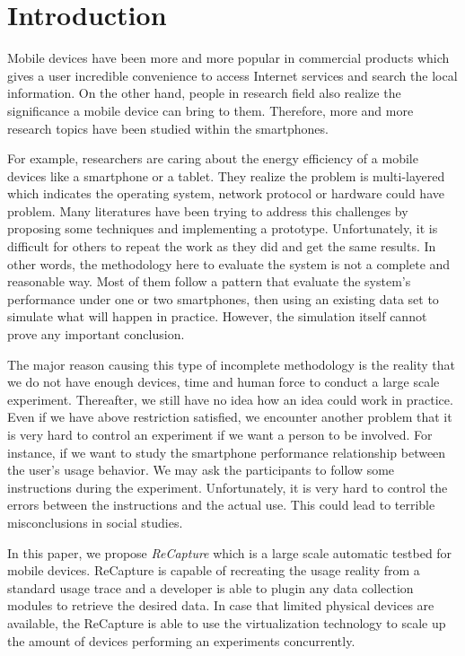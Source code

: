 \section{Introduction}\label{sec:introduction}
Mobile devices have been more and more popular in commercial products which gives a user incredible convenience to access Internet services and search the local information. On the other hand, people in research field also realize the significance a mobile device can bring to them. Therefore, more and more research topics have been studied within the smartphones.

For example, researchers are caring about the energy efficiency of a mobile devices like a smartphone or a tablet. They realize the problem is multi-layered which indicates the operating system, network protocol or hardware could have problem. Many literatures have been trying to address this challenges by proposing some techniques and implementing a prototype. Unfortunately, it is difficult for others to repeat the work as they did and get the same results. In other words, the methodology here to evaluate the system is not a complete and reasonable way. Most of them follow a pattern that evaluate the system's performance under one or two smartphones, then using an existing data set to simulate what will happen in practice. However, the simulation itself cannot prove any important conclusion.

The major reason causing this type of incomplete methodology is the reality that we do not have enough devices, time and human force to conduct a large scale experiment. Thereafter, we still have no idea how an idea could work in practice. Even if we have above restriction satisfied, we encounter another problem that it is very hard to control an experiment if we want a person to be involved. For instance, if we want to study the smartphone performance relationship between the user's usage behavior. We may ask the participants to follow some instructions during the experiment. Unfortunately, it is very hard to control the errors between the instructions and the actual use. This could lead to terrible misconclusions in social studies.

In this paper, we propose \emph{ReCapture} which is a large scale automatic testbed for mobile devices. ReCapture is capable of recreating the usage reality from a standard usage trace and a developer is able to plugin any data collection modules to retrieve the desired data. In case that limited physical devices are available, the ReCapture is able to use the virtualization technology to scale up the amount of devices performing an experiments concurrently. 

